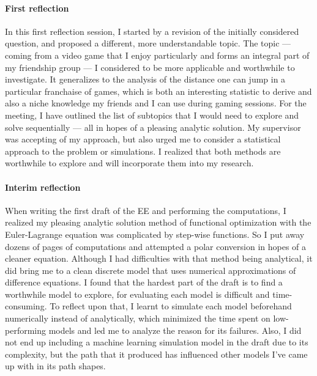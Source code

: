 \documentclass[a4paper,12pt]{article}
\begin{document}
\paragraph{First reflection}
	In this first reflection session, I started by a revision of the initially considered question, and proposed a different, more understandable topic. The topic --- coming from a video game that I enjoy particularly and forms an integral part of my friendship group --- I considered to be more applicable and worthwhile to investigate. It generalizes to the analysis of the distance one can jump in a particular franchaise of games, which is both an interesting statistic to derive and also a niche knowledge my friends and I can use during gaming sessions. For the meeting, I have outlined the list of subtopics that I would need to explore and solve sequentially --- all in hopes of a pleasing analytic solution. My supervisor was accepting of my approach, but also urged me to consider a statistical approach to the problem or simulations. I realized that both methods are worthwhile to explore and will incorporate them into my research.

\paragraph{Interim reflection}
When writing the first draft of the EE and performing the computations, I realized my pleasing analytic solution method of functional optimization with the Euler-Lagrange equation was complicated by step-wise functions. So I put away dozens of pages of computations and attempted a polar conversion in hopes of a cleaner equation. Although I had difficulties with that method being analytical, it did bring me to a clean discrete model that uses numerical approximations of difference equations. I found that the hardest part of the draft is to find a worthwhile model to explore, for evaluating each model is difficult and time-consuming. To reflect upon that, I learnt to simulate each model beforehand numerically instead of analytically, which minimized the time spent on low-performing models and led me to analyze the reason for its failures. Also, I did not end up including a machine learning simulation model in the draft due to its complexity, but the path that it produced has influenced other models I've came up with in its path shapes.
\end{document}
